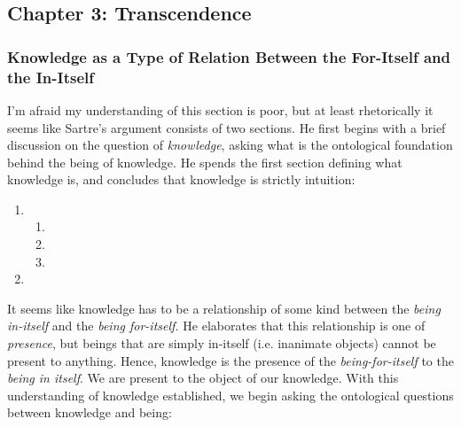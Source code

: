 \subsection{Chapter 3: Transcendence}

\subsubsection{Knowledge as a Type of Relation Between the For-Itself and the In-Itself}

I'm afraid my understanding of this section is poor, but at least rhetorically it seems like Sartre's argument consists of two sections. He first begins with a brief discussion on the question of \emph{knowledge}, asking what is the ontological foundation behind the being of knowledge. He spends the first section defining what knowledge is, and concludes that knowledge is strictly intuition:

\begin{enumerate}
  \item {}
  \begin{enumerate}
    \item {}
    \item {}
    \item {}
  \end{enumerate}
  \item {}
\end{enumerate}

It seems like knowledge has to be a relationship of some kind between the \emph{being in-itself} and the \emph{being for-itself.} He elaborates that this relationship is one of \emph{presence}, but beings that are simply in-itself (i.e. inanimate objects) cannot be present to anything. Hence, knowledge is the presence of the \emph{being-for-itself} to the \emph{being in itself}. We are present to the object of our knowledge. With this understanding of knowledge established, we begin asking the ontological questions between knowledge and being:

